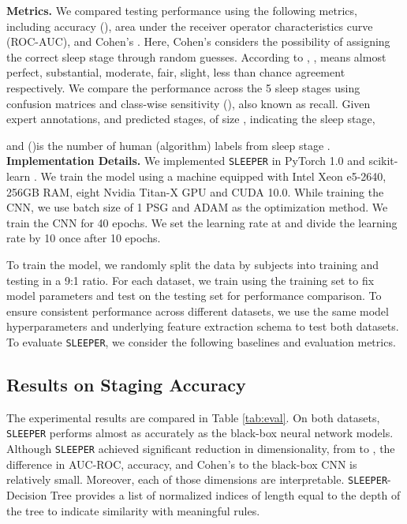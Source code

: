 \documentclass[pmlr]{jmlr}
\newcommand{\mname}
{\texttt{SLEEPER}\xspace}
\begin{document}
\noindent\textbf{Metrics.} We compared testing performance using the following metrics, including accuracy (), area under the receiver operator characteristics curve (ROC-AUC), and Cohen's . Here, Cohen's  considers the possibility of assigning the correct sleep stage through random guesses. According to \citep{kappa_meaning}, , means almost perfect, substantial, moderate, fair, slight, less than chance agreement respectively.  We compare the performance across the 5 sleep stages using confusion matrices and class-wise sensitivity (), also known as recall. Given expert annotations,  and predicted stages,  of size ,  indicating the sleep stage,

 and  ()is the number of human (algorithm) labels from sleep stage .
\\
 
 
\noindent\textbf{Implementation Details.} We implemented \mname in PyTorch 1.0 \citep{paszke2017automatic} and scikit-learn \citep{scikit-learn}. We train the model using a machine equipped with Intel Xeon e5-2640, 256GB RAM, eight Nvidia Titan-X GPU and CUDA 10.0. While training the CNN, we use batch size of 1 PSG and ADAM as the optimization method.  We train the CNN for 40 epochs. We set the learning rate at  and divide the learning rate by 10 once after 10 epochs.

To train the model, we randomly split the data by subjects into training and testing in a 9:1 ratio. For each dataset, we train using the training set to fix model parameters and test on the testing set for performance comparison. To ensure consistent performance across different datasets, we use the same model hyperparameters and underlying feature extraction schema to test both datasets. To evaluate \mname, we consider the following baselines and evaluation metrics.\\
\subsection{Results on Staging Accuracy} 



The experimental results are compared in Table \ref{tab:eval}. On both datasets, \mname performs almost as accurately as the black-box neural network models. Although \mname achieved significant reduction in dimensionality, from  to , the difference in AUC-ROC, accuracy, and Cohen's  to the black-box CNN is relatively small. Moreover, each of those  dimensions are interpretable. \mname-Decision Tree provides a list of normalized indices of length equal to the depth of the tree to indicate similarity with meaningful rules.
\end{document}
